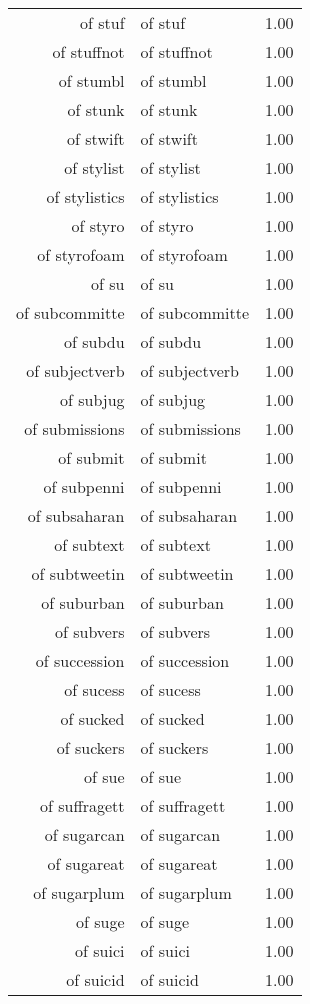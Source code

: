 \begin{table}[ht]
\begin{tabular}{rlr}
  of stuf & of stuf & 1.00 \\ 
  of stuffnot & of stuffnot & 1.00 \\ 
  of stumbl & of stumbl & 1.00 \\ 
  of stunk & of stunk & 1.00 \\ 
  of stwift & of stwift & 1.00 \\ 
  of stylist & of stylist & 1.00 \\ 
  of stylistics & of stylistics & 1.00 \\ 
  of styro & of styro & 1.00 \\ 
  of styrofoam & of styrofoam & 1.00 \\ 
  of su & of su & 1.00 \\ 
  of subcommitte & of subcommitte & 1.00 \\ 
  of subdu & of subdu & 1.00 \\ 
  of subjectverb & of subjectverb & 1.00 \\ 
  of subjug & of subjug & 1.00 \\ 
  of submissions & of submissions & 1.00 \\ 
  of submit & of submit & 1.00 \\ 
  of subpenni & of subpenni & 1.00 \\ 
  of subsaharan & of subsaharan & 1.00 \\ 
  of subtext & of subtext & 1.00 \\ 
  of subtweetin & of subtweetin & 1.00 \\ 
  of suburban & of suburban & 1.00 \\ 
  of subvers & of subvers & 1.00 \\ 
  of succession & of succession & 1.00 \\ 
  of sucess & of sucess & 1.00 \\ 
  of sucked & of sucked & 1.00 \\ 
  of suckers & of suckers & 1.00 \\ 
  of sue & of sue & 1.00 \\ 
  of suffragett & of suffragett & 1.00 \\ 
  of sugarcan & of sugarcan & 1.00 \\ 
  of sugareat & of sugareat & 1.00 \\ 
  of sugarplum & of sugarplum & 1.00 \\ 
  of suge & of suge & 1.00 \\ 
  of suici & of suici & 1.00 \\ 
  of suicid & of suicid & 1.00 \\ 

\end{tabular}
\end{table}

